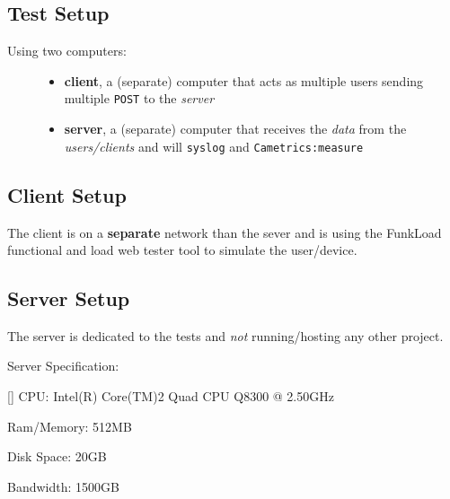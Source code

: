 \documentclass[10pt,a4paper,english]{article}
\newenvironment{lineblock}[1]
{\begin{list}{}
  {\setlength{\partopsep}{\parskip}
   \addtolength{\partopsep}{\baselineskip}
   \topsep0pt\itemsep0.15\baselineskip\parsep0pt
   \leftmargin#1}
 \raggedright}
{\end{list}}
\begin{document}
\subsection*{Test Setup}
\label{test-setup}
\begin{description}
\item[{Using two computers:}] \leavevmode \begin{itemize}
\item {} 
\textbf{client}, a (separate) computer that acts as multiple users sending multiple \texttt{POST} to the \emph{server}

\item {} 
\textbf{server}, a (separate) computer that receives the \emph{data} from the \emph{users/clients} and will \texttt{syslog} and \texttt{Cametrics:measure}

\end{itemize}

\end{description}



\hypertarget{client-setup}{}
\subsection*{Client Setup}
\label{client-setup}

The client is on a \textbf{separate} network than the sever and is using the FunkLoad functional and load web tester tool to simulate the user/device.



\hypertarget{server-setup}{}
\subsection*{Server Setup}
\label{server-setup}

The server is dedicated to the tests and \emph{not} running/hosting any other project.

Server Specification:

\begin{lineblock}{0em}
\item[] CPU: Intel(R) Core(TM)2 Quad CPU Q8300  @ 2.50GHz
\item[] Ram/Memory: 512MB
\item[] Disk Space: 20GB
\item[] Bandwidth: 1500GB
\end{lineblock}
\end{document}
